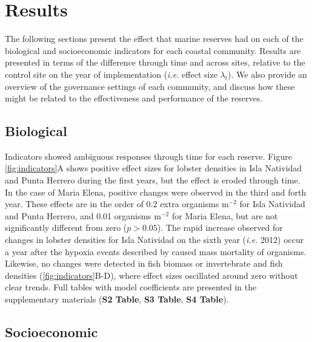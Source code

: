 \documentclass{frontiersSCNS}
\begin{document}
\section{Results}\label{results}

The following sections present the effect that marine reserves had on
each of the biological and socioeconomic indicators for each coastal
community. Results are presented in terms of the difference through time
and across sites, relative to the control site on the year of
implementation (\emph{i.e.} effect size \(\lambda_t\)). We also provide
an overview of the governance settings of each community, and discuss
how these might be related to the effectiveness and performance of the
reserves.

\subsection{Biological}\label{biological}

Indicators showed ambiguous responses through time for each reserve.
Figure \ref{fig:indicators}A shows positive effect sizes for lobster
densities in Isla Natividad and Punta Herrero during the first years,
but the effect is eroded through time. In the case of Maria Elena,
positive changes were observed in the third and forth year. These
effects are in the order of 0.2 extra organisms \(\mathrm{m}^{-2}\) for
Isla Natividad and Punta Herrero, and 0.01 organisms \(\mathrm{m}^{-2}\)
for Maria Elena, but are not significantly different from zero
(\(p > 0.05\)). The rapid increase observed for changes in lobster
densities for Isla Natividad on the sixth year (\emph{i.e.} 2012) occur
a year after the hypoxia events described by \citet{micheli_2012-EU}
caused mass mortality of organisms. Likewise, no changes were detected
in fish biomass or invertebrate and fish densities
(\ref{fig:indicators}B-D), where effect sizes oscillated around zero
without clear trends. Full tables with model coefficients are presented
in the supplementary materials (\textbf{S2 Table}, \textbf{S3 Table},
\textbf{S4 Table}).

\subsection{Socioeconomic}\label{socioeconomic}
\end{document}
